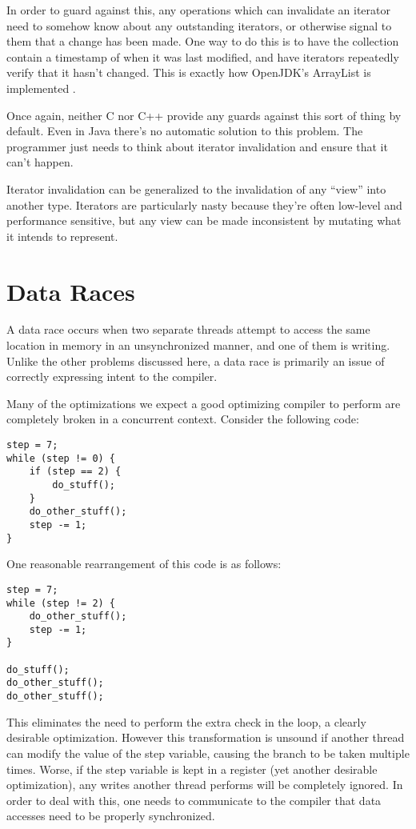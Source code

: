 In order to guard against this, any operations which can invalidate an iterator
need to somehow know about any outstanding iterators, or otherwise signal to
them that a change has been made. One way to do this is to have the
collection contain a timestamp of when it was last modified, and have iterators
repeatedly verify that it hasn't changed. This is exactly how OpenJDK's ArrayList is
implemented \cite{jdkiter}.

Once again, neither C nor C++ provide any guards against this sort of thing
by default. Even in Java there's no automatic solution to this problem. The
programmer just needs to think about iterator invalidation and ensure that it
can't happen.

Iterator invalidation can be generalized to the invalidation of any ``view''
into another type. Iterators are particularly nasty because they're often
low-level and performance sensitive, but any view can be made
inconsistent by mutating what it intends to represent.






\section{Data Races}

A data race occurs when two separate threads attempt to access the same location
in memory in an unsynchronized manner, and one of them is writing. Unlike the
other problems discussed here, a data race is primarily an issue of correctly
expressing intent to the compiler.

Many of the optimizations we expect a good optimizing compiler to perform are
completely broken in a concurrent context. Consider the following code:

\begin{verbatim}
step = 7;
while (step != 0) {
    if (step == 2) {
        do_stuff();
    }
    do_other_stuff();
    step -= 1;
}
\end{verbatim}

One reasonable rearrangement of this code is as follows:

\begin{verbatim}
step = 7;
while (step != 2) {
    do_other_stuff();
    step -= 1;
}

do_stuff();
do_other_stuff();
do_other_stuff();
\end{verbatim}

This eliminates the need to perform the extra check in the loop, a clearly
desirable optimization. However this transformation is unsound if another
thread can modify the value of the step variable, causing the branch to be
taken multiple times. Worse, if the step variable is kept in a register
(yet another desirable optimization), any writes another thread performs
will be completely ignored. In order to deal with this, one needs to
communicate to the compiler that data accesses need to be properly synchronized.

